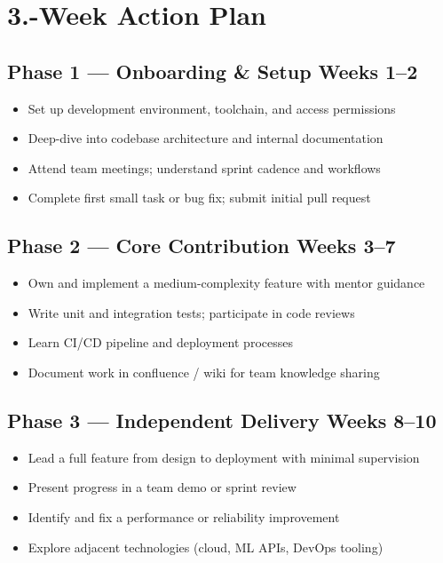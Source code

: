 \documentclass[12pt,a4paper]{article}
\begin{document}
\section{3.-Week Action Plan}

\subsection{Phase 1 — Onboarding \& Setup \hfill \textcolor{accent}{Weeks 1--2}}
\begin{itemize}[leftmargin=1.4em, itemsep=2pt]
  \item Set up development environment, toolchain, and access permissions
  \item Deep-dive into codebase architecture and internal documentation
  \item Attend team meetings; understand sprint cadence and workflows
  \item Complete first small task or bug fix; submit initial pull request
\end{itemize}

\subsection{Phase 2 — Core Contribution \hfill \textcolor{accent}{Weeks 3--7}}
\begin{itemize}[leftmargin=1.4em, itemsep=2pt]
  \item Own and implement a medium-complexity feature with mentor guidance
  \item Write unit and integration tests; participate in code reviews
  \item Learn CI/CD pipeline and deployment processes
  \item Document work in confluence / wiki for team knowledge sharing
\end{itemize}

\subsection{Phase 3 — Independent Delivery \hfill \textcolor{accent}{Weeks 8--10}}
\begin{itemize}[leftmargin=1.4em, itemsep=2pt]
  \item Lead a full feature from design to deployment with minimal supervision
  \item Present progress in a team demo or sprint review
  \item Identify and fix a performance or reliability improvement
  \item Explore adjacent technologies (cloud, ML APIs, DevOps tooling)
\end{itemize}
\end{document}
